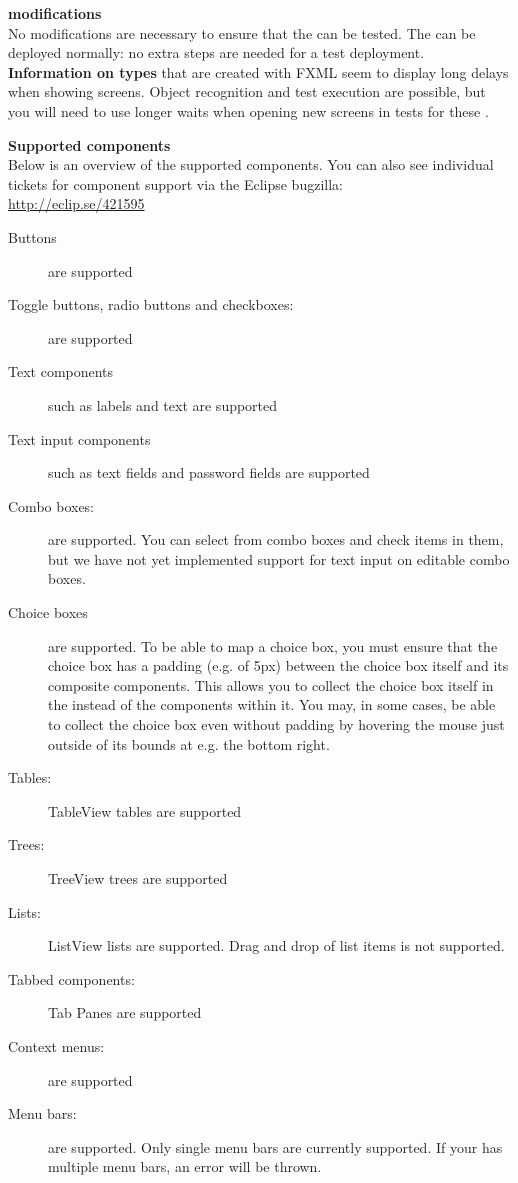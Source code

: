 \textbf{\gdaut{} modifications}\\
No modifications are necessary to ensure that the \gdaut{} can be tested. The \gdaut{} can be deployed normally: no extra steps are needed for a test deployment.
\textbf{Information on \gdaut{} types}
\gdauts{} that are created with FXML seem to display long delays when showing screens. Object recognition and test execution are possible, but you will need to use longer waits when opening new screens in tests for these \gdauts{}.

\textbf{Supported components}\\
Below is an overview of the supported components. You can also see individual tickets for component support via the Eclipse bugzilla:\\
\url{http://eclip.se/421595}
\begin{description}
\item [Buttons]{are supported}
\item [Toggle buttons, radio buttons and checkboxes:]{are supported}
\item [Text components]{such as labels and text are supported}
\item [Text input components]{such as text fields and password fields are supported}
\item [Combo boxes:]{are supported. You can select from combo boxes and check items in them, but we have not yet implemented support for text input on editable combo boxes. }
\item [Choice boxes]{are supported. To be able to map a choice box, you must ensure that the choice box has a padding (e.g. of 5px) between the choice box itself and its composite components. This allows you to collect the choice box itself in the \gdomm{} instead of the components within it. You may, in some cases, be able to collect the choice box even without padding by hovering the mouse just outside of its bounds at e.g. the bottom right.}
\item [Tables:]{TableView tables are supported}
\item [Trees:]{TreeView trees are supported}
\item [Lists:]{ListView lists are supported. Drag and drop of list items is not supported. }
\item [Tabbed components:]{Tab Panes are supported}
\item [Context menus:]{are supported}
\item [Menu bars:]{are supported. Only single menu bars are currently supported. If your \gdaut{} has multiple menu bars, an error will be thrown.}

\end{description}

